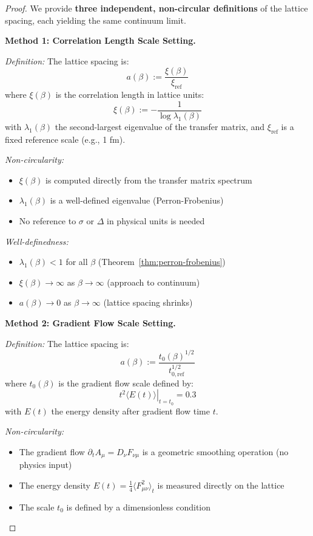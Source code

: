 \begin{proof}
We provide \textbf{three independent, non-circular definitions} of the lattice 
spacing, each yielding the same continuum limit.

\textbf{Method 1: Correlation Length Scale Setting.}

\textit{Definition:} The lattice spacing is:
\begin{equation}
a(\beta) := \frac{\xi(\beta)}{\xi_{\mathrm{ref}}}
\end{equation}
where $\xi(\beta)$ is the correlation length in lattice units:
\[
\xi(\beta) := -\frac{1}{\log\lambda_1(\beta)}
\]
with $\lambda_1(\beta)$ the second-largest eigenvalue of the transfer matrix, 
and $\xi_{\mathrm{ref}}$ is a fixed reference scale (e.g., 1 fm).

\textit{Non-circularity:} 
\begin{itemize}
\item $\xi(\beta)$ is computed directly from the transfer matrix spectrum
\item $\lambda_1(\beta)$ is a well-defined eigenvalue (Perron-Frobenius)
\item No reference to $\sigma$ or $\Delta$ in physical units is needed
\end{itemize}

\textit{Well-definedness:}
\begin{itemize}
\item $\lambda_1(\beta) < 1$ for all $\beta$ (Theorem~\ref{thm:perron-frobenius})
\item $\xi(\beta) \to \infty$ as $\beta \to \infty$ (approach to continuum)
\item $a(\beta) \to 0$ as $\beta \to \infty$ (lattice spacing shrinks)
\end{itemize}

\textbf{Method 2: Gradient Flow Scale Setting.}

\textit{Definition:} The lattice spacing is:
\begin{equation}
a(\beta) := \frac{t_0(\beta)^{1/2}}{t_{0,\mathrm{ref}}^{1/2}}
\end{equation}
where $t_0(\beta)$ is the gradient flow scale defined by:
\[
\left. t^2 \langle E(t) \rangle \right|_{t = t_0} = 0.3
\]
with $E(t)$ the energy density after gradient flow time $t$.

\textit{Non-circularity:}
\begin{itemize}
\item The gradient flow $\partial_t A_\mu = D_\nu F_{\nu\mu}$ is a geometric 
smoothing operation (no physics input)
\item The energy density $E(t) = \frac{1}{4}\langle F_{\mu\nu}^2 \rangle_t$ is 
measured directly on the lattice
\item The scale $t_0$ is defined by a dimensionless condition
\end{itemize}


\end{proof}
